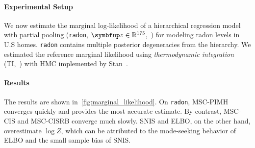 \paragraph{Experimental Setup}
We now estimate the marginal log-likelihood of a hierarchical regression model with partial pooling (\texttt{radon}, \(\vz \in \mathbb{R}^{175}\),~\citealt{gelman_data_2007}) for modeling radon levels in U.S homes.
\texttt{radon} contains multiple posterior degeneracies from the hierarchy.
We estimated the reference marginal likelihood using \textit{thermodynamic integration} (TI,~\citealt{gelman_simulating_1998, neal_annealed_2001, lartillot_computing_2006}) with HMC implemented by Stan~\citep{carpenter_stan_2017, betancourt_conceptual_2017}.

\paragraph{Results}
The results are shown in~\cref{fig:marginal_likelihood}.
On \texttt{radon}, MSC-PIMH converges quickly and provides the most accurate estimate.
By contrast, MSC-CIS and MSC-CISRB converge much slowly.
SNIS and ELBO, on the other hand, overestimate \(\log Z\), which can be attributed to the mode-seeking behavior of ELBO and the small sample bias of SNIS.


